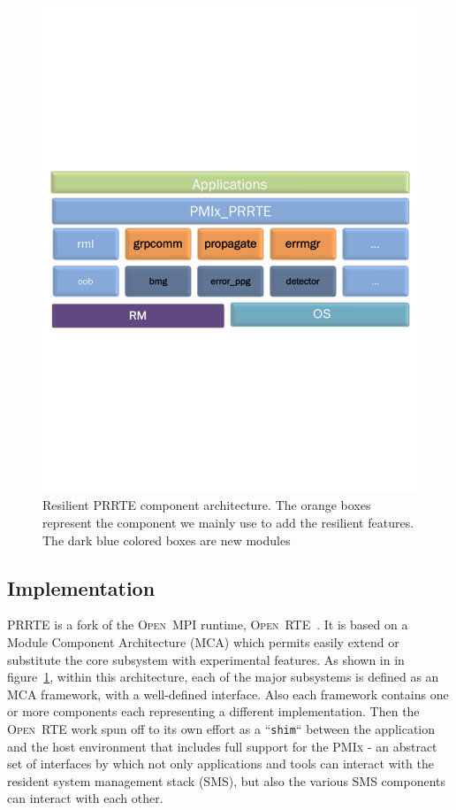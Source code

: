 \documentclass[sigconf]{acmart}
\newcommand{\prrte}[0]{\textsc{PRRTE}\xspace}
\newcommand{\pmix}[0]{\textsc{PMIx}\xspace}
\newcommand{\orte}[0]{\textsc{Open~RTE}\xspace}
\newcommand{\ompi}[0]{\textsc{Open~MPI}\xspace}
\begin{document}
\begin{figure}[h]
  \centering
  \includegraphics[trim=0.2cm 9.0cm 0.2cm 9cm,width=\linewidth]{PMIx_PRRTE.pdf}
  \caption{Resilient \prrte component architecture. The orange boxes represent the component we mainly use to add the resilient features. The dark blue colored boxes are new modules}\label{fig:prrte}
\end{figure}

\subsection{Implementation}

 \prrte is a fork of the \ompi runtime, \orte~\cite{Castain05}. It is based on a Module Component Architecture (MCA) which permits easily extend or substitute the core subsystem with experimental features. As shown in in figure~\ref{fig:prrte}, within this architecture, each of the major subsystems is defined as an MCA framework, with a well-defined interface. Also each framework contains one or more components each representing a different implementation. Then the \orte work spun off to its own effort as a ``\verb|shim|`` between the application and the host environment that includes full support for the \pmix \cite{CASTAIN18} - an abstract set of interfaces by which not only applications and tools can interact with the resident system management stack (SMS), but also the various SMS components can interact with each other. 
\end{document}
